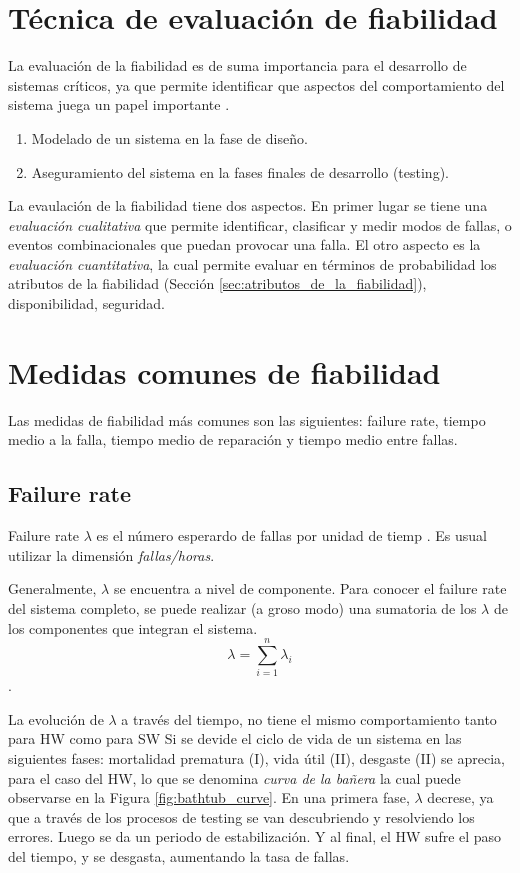 \section{Técnica de evaluación de fiabilidad}
La evaluación de la fiabilidad es de suma importancia para el desarrollo de sistemas críticos, ya
que permite identificar que aspectos del comportamiento del sistema juega un papel importante
\citep{FTDesign}.

\begin{enumerate}
 \item Modelado de un sistema en la fase de diseño.
 \item Aseguramiento del sistema en la fases finales de desarrollo (testing).
\end{enumerate}

La evaulación de la fiabilidad tiene dos aspectos. En primer lugar se tiene una \textit{evaluación
cualitativa} que permite identificar, clasificar y medir modos de fallas, o eventos combinacionales
que puedan provocar una falla. El otro aspecto es la \textit{evaluación cuantitativa}, la cual
permite evaluar en términos de probabilidad los atributos de la fiabilidad
(Sección \ref{sec:atributos_de_la_fiabilidad}), disponibilidad, seguridad.

\section{Medidas comunes de fiabilidad}
Las medidas de fiabilidad más comunes son las siguientes: failure rate, tiempo medio a la falla,
tiempo medio de reparación y tiempo medio entre fallas.

\subsection{Failure rate}
Failure rate $\lambda$ es el número esperardo de fallas por unidad de tiemp \citep{FTDesign}. Es
usual utilizar la dimensión \textit{fallas/horas}.

Generalmente, $\lambda$ se encuentra a nivel de componente. Para conocer el failure rate del
sistema completo, se puede realizar (a groso modo) una sumatoria de los $\lambda$ de los
componentes que integran el sistema. $$\lambda=\sum_{i=1}^{n} \lambda_i$$.

La evolución de $\lambda$ a través del tiempo, no tiene el mismo comportamiento tanto para \ac{HW} como para \ac{SW}
Si se devide el ciclo de vida de un sistema en las siguientes fases: mortalidad prematura (I), vida útil (II), desgaste (II) \citep{FTDesign}
se aprecia, para el caso del \ac{HW}, lo que se denomina \textit{curva de la bañera} la cual puede observarse en la Figura \ref{fig:bathtub_curve}.
En una primera fase, $\lambda$ decrese, ya que a través de los procesos de testing se van descubriendo y resolviendo los errores. Luego se da un periodo de estabilización.
Y al final, el \ac{HW} sufre el paso del tiempo, y se desgasta, aumentando la tasa de fallas.

